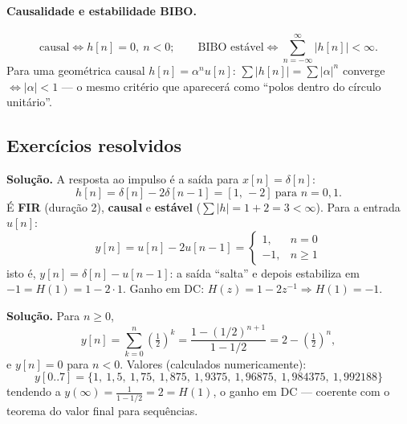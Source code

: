 \paragraph{Causalidade e estabilidade BIBO.}
\[
  \text{causal}\iff h[n]=0,\ n<0;\qquad
  \text{BIBO estável}\iff \sum_{n=-\infty}^{\infty}|h[n]|<\infty .
\]
Para uma geométrica causal $h[n]=\alpha^nu[n]$:
$\sum|h[n]|=\sum|\alpha|^n$ converge $\iff|\alpha|<1$ — o mesmo critério que
aparecerá como ``polos dentro do círculo unitário''.

\subsection*{Exercícios resolvidos}


\textbf{Solução.} A resposta ao impulso é a saída para $x[n]=\delta[n]$:
\[
  h[n]=\delta[n]-2\delta[n-1]=[1,\,-2]\ \text{para }n=0,1 .
\]
É \textbf{FIR} (duração 2), \textbf{causal} e \textbf{estável}
($\sum|h|=1+2=3<\infty$). Para a entrada $u[n]$:
\[
  y[n]=u[n]-2u[n-1]=
  \begin{cases}1,&n=0\\ -1,&n\ge1\end{cases}
\]
isto é, $y[n]=\delta[n]-u[n-1]$: a saída ``salta'' e depois estabiliza em
$-1=H(1)=1-2\cdot1$. Ganho em DC: $H(z)=1-2z^{-1}\Rightarrow H(1)=-1$.



\textbf{Solução.} Para $n\ge0$,
\[
  y[n]=\sum_{k=0}^{n}\left(\tfrac12\right)^k
      =\frac{1-(1/2)^{n+1}}{1-1/2}
      =2-\left(\tfrac12\right)^{n},
\]
e $y[n]=0$ para $n<0$. Valores (calculados numericamente):
\[
  y[0..7]=\{1,\ 1{,}5,\ 1{,}75,\ 1{,}875,\ 1{,}9375,\ 1{,}96875,\
  1{,}984375,\ 1{,}992188\}
\]
tendendo a $y(\infty)=\frac{1}{1-1/2}=2=H(1)$, o ganho em DC — coerente com o
teorema do valor final para sequências.

